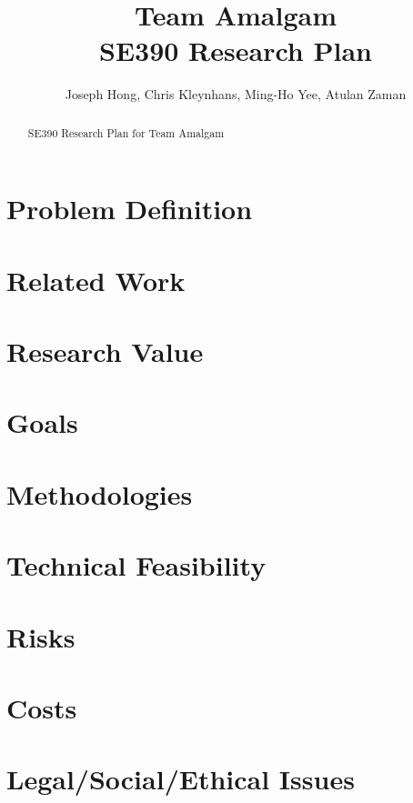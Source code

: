 \documentclass[11pt]{article}
\title{Team Amalgam \\ SE390 Research Plan}
\author{Joseph Hong, Chris Kleynhans, Ming-Ho Yee, Atulan Zaman}
\begin{document}
\maketitle

\begin{abstract}

SE390 Research Plan for Team Amalgam

\end{abstract}

\tableofcontents
\newpage

\section{Problem Definition}

\section{Related Work}

\section{Research Value}

\section{Goals}

\section{Methodologies}

\section{Technical Feasibility}

\section{Risks}

\section{Costs}

\section{Legal/Social/Ethical Issues}

\end{document}
